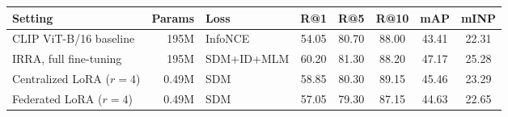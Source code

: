 \begin{tabular}{l r l ccccc}
\toprule
Setting & Params & Loss & R@1 & R@5 & R@10 & mAP & mINP\\
\midrule
CLIP ViT-B/16 baseline & 195M & InfoNCE & 54.05 & 80.70 & 88.00 & 43.41 & 22.31\\
IRRA, full fine-tuning & 195M & SDM+ID+MLM & 60.20 & 81.30 & 88.20 & 47.17 & 25.28\\
Centralized LoRA ($r{=}4$) & 0.49M & SDM & 58.85 & 80.30 & 89.15 & 45.46 & 23.29\\
Federated LoRA ($r{=}4$) & 0.49M & SDM & 57.05 & 79.30 & 87.15 & 44.63 & 22.65\\
\bottomrule
\end{tabular}
